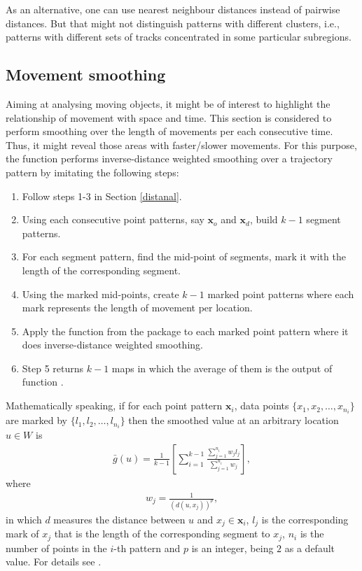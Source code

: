 \documentclass[article]{jss}
\begin{document}
As an alternative, one can use nearest neighbour distances instead of pairwise distances. But that might not distinguish patterns with different clusters, i.e., patterns with different sets of tracks concentrated in some particular subregions. 
  \subsection{Movement smoothing}
  Aiming at analysing moving objects, it might be of interest to highlight the relationship of movement with  space and time. This section is considered to perform smoothing over the length of movements per each consecutive time. Thus, it might reveal those areas with faster/slower movements. For this purpose, the function  performs inverse-distance weighted smoothing over a trajectory pattern by imitating the following steps:
  \begin{leftbar}
  \begin{enumerate}
  \item Follow steps 1-3 in Section \ref{distanal}.
  \item Using each consecutive point patterns, say $\mathbf{x}_o$ and $\mathbf{x}_d$, build $k-1$ segment patterns.
  \item For each segment pattern, find the mid-point of segments, mark it with the length of the corresponding segment.
  \item Using the marked mid-points, create $k-1$ marked point patterns where each mark represents the length of movement per location.
  \item Apply the function  from the package  \citep{BRT15} to each marked point pattern where it does inverse-distance weighted smoothing. 
  \item Step 5 returns $k-1$ maps in which the average of them is the output of function .
  \end{enumerate}
  \end{leftbar}
  Mathematically speaking, if for each point pattern $\mathbf{x}_i$, data points $\{ x_1,x_2,\ldots,x_{n_i} \}$ are marked by $\{ l_1,l_2,\ldots,l_{n_i} \}$ then the smoothed value at an arbitrary location $u\in W$ is
  \begin{eqnarray}
  \bar{g}(u)=\frac{1}{k-1} \left[ \sum\limits_{i=1}^{k-1} \frac{\sum\limits_{j=1}^{n_i}w_j l_j}{\sum\limits_{j=1}^{n_i} w_j} \right],
  \end{eqnarray}
  where 
  \begin{eqnarray}
  w_j=\frac{1}{(d(u,x_j))^p},
  \end{eqnarray}
  in which $d$ measures the distance between $u$ and $x_j \in \mathbf{x}_i$, $l_j$ is the corresponding mark of $x_j$ that is the length of the corresponding segment to $x_j$, $n_i$ is the number of points in the $i$-th pattern and $p$ is an integer, being $2$ as a default value. For details see \citet[Chapter 15]{BRT15}.
  
\end{document}
